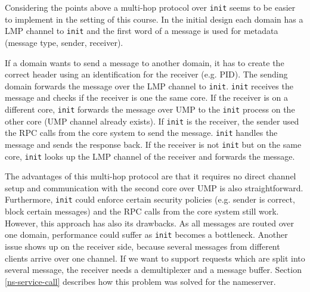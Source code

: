 Considering the points above a multi-hop protocol over \verb|init| seems to be easier
to implement in the setting of this course. In the initial design each domain has a
LMP channel to \verb|init| and the first word of a message is used for metadata (message
type, sender, receiver). 

If a domain wants to send a message to another domain, it has to create the correct header 
using an identification for the receiver (e.g. PID). The sending domain forwards the 
message over the LMP channel to \verb|init|. \verb|init| receives the message and checks
if the receiver is one the same core. If the receiver is on a different core, \verb|init|
forwards the message over UMP to the \verb|init| process on the other core (UMP channel 
already exists). If \verb|init| is the receiver, the sender used the RPC calls from 
the core system to send the message. \verb|init| handles the message and sends the 
response back. If the receiver is not \verb|init| but on the same core, \verb|init| looks
up the LMP channel of the receiver and forwards the message.

The advantages of this multi-hop protocol are that it requires no direct channel setup and
communication with the second core over UMP is also straightforward. Furthermore, \verb|init|
could enforce certain security policies (e.g. sender is correct, block certain messages) and
the RPC calls from the core system still work. However, this approach has also its drawbacks. 
As all messages are routed over one domain, performance could suffer as \verb|init| becomes 
a bottleneck. Another issue shows up on the receiver side, because several messages from different
clients arrive over one channel. If we want to support requests which are split into several message,
the receiver needs a demultiplexer and a message buffer. Section \ref{ns-service-call} describes
how this problem was solved for the nameserver.


